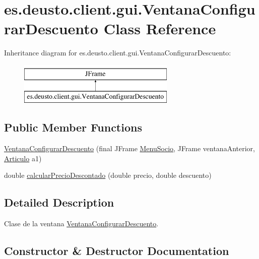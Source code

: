\hypertarget{classes_1_1deusto_1_1client_1_1gui_1_1_ventana_configurar_descuento}{}\section{es.\+deusto.\+client.\+gui.\+Ventana\+Configurar\+Descuento Class Reference}
\label{classes_1_1deusto_1_1client_1_1gui_1_1_ventana_configurar_descuento}
Inheritance diagram for es.\+deusto.\+client.\+gui.\+Ventana\+Configurar\+Descuento\+:\begin{figure}[H]
\begin{center}
\leavevmode
\includegraphics[height=2.000000cm]{classes_1_1deusto_1_1client_1_1gui_1_1_ventana_configurar_descuento}
\end{center}
\end{figure}
\subsection*{Public Member Functions}
\begin{DoxyCompactItemize}
\item 
\mbox{\hyperlink{classes_1_1deusto_1_1client_1_1gui_1_1_ventana_configurar_descuento_a2cc21277692e563ea8ab7fab75d65150}{Ventana\+Configurar\+Descuento}} (final J\+Frame \mbox{\hyperlink{classes_1_1deusto_1_1client_1_1gui_1_1_menu_socio}{Menu\+Socio}}, J\+Frame ventana\+Anterior, \mbox{\hyperlink{classes_1_1deusto_1_1client_1_1data_1_1_articulo}{Articulo}} a1)
\item 
double \mbox{\hyperlink{classes_1_1deusto_1_1client_1_1gui_1_1_ventana_configurar_descuento_a4d6491fbdf815068a20778ee9c71d39f}{calcular\+Precio\+Descontado}} (double precio, double descuento)
\end{DoxyCompactItemize}


\subsection{Detailed Description}
Clase de la ventana \mbox{\hyperlink{classes_1_1deusto_1_1client_1_1gui_1_1_ventana_configurar_descuento}{Ventana\+Configurar\+Descuento}}. 

\subsection{Constructor \& Destructor Documentation}
\mbox{\label{classes_1_1deusto_1_1client_1_1gui_1_1_ventana_configurar_descuento_a2cc21277692e563ea8ab7fab75d65150}} 
